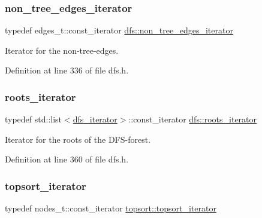\subsubsection{\texorpdfstring{non\+\_\+tree\+\_\+edges\+\_\+iterator}{non\_tree\_edges\_iterator}}
{\footnotesize\ttfamily typedef edges\+\_\+t\+::const\+\_\+iterator \mbox{\hyperlink{classdfs_a95e353f354d3b31daded0c4fe749171a}{dfs\+::non\+\_\+tree\+\_\+edges\+\_\+iterator}}\hspace{0.3cm}{\ttfamily [inherited]}}



Iterator for the non-\/tree-\/edges. 



Definition at line 336 of file dfs.\+h.

\mbox{\label{classdfs_a1ea6e8eb2766ac95ac48a8523359065a}} 
\subsubsection{\texorpdfstring{roots\+\_\+iterator}{roots\_iterator}}
{\footnotesize\ttfamily typedef std\+::list$<$\mbox{\hyperlink{classdfs_a15fe023a5a1f7ddda00f3d87110d9a32}{dfs\+\_\+iterator}}$>$\+::const\+\_\+iterator \mbox{\hyperlink{classdfs_a1ea6e8eb2766ac95ac48a8523359065a}{dfs\+::roots\+\_\+iterator}}\hspace{0.3cm}{\ttfamily [inherited]}}



Iterator for the roots of the D\+F\+S-\/forest. 



Definition at line 360 of file dfs.\+h.

\mbox{\label{classtopsort_a04a42f813522640e17dddbaeb55498e4}} 
\subsubsection{\texorpdfstring{topsort\+\_\+iterator}{topsort\_iterator}}
{\footnotesize\ttfamily typedef nodes\+\_\+t\+::const\+\_\+iterator \mbox{\hyperlink{classtopsort_a04a42f813522640e17dddbaeb55498e4}{topsort\+::topsort\+\_\+iterator}}}



